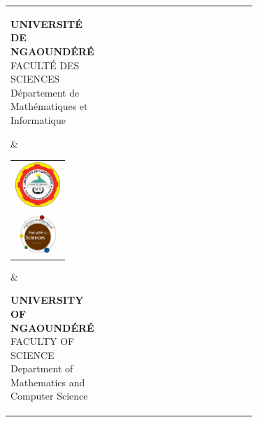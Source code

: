 \thispagestyle{empty}


\vspace*{-3.5cm}
\begin{center}
	\setlength{\tabcolsep}{2pt}
	\begin{tabular}[t]{p{0.35\linewidth} c p{0.35\linewidth}}
		\parbox[t]{\linewidth}{
			\raggedright
			{\bfseries UNIVERSITÉ DE NGAOUNDÉRÉ} \newline
			FACULTÉ DES SCIENCES \newline
			Département de Mathématiques \newline
			et Informatique
		}
		 &
		\begin{tabular}{c}
			\includegraphics[height=1.7cm]{figures/univ_logo.jpeg} \\[0.2cm]
			\includegraphics[height=1.5cm]{figures/fac_logo.jpeg}
		\end{tabular}
		 &
		\parbox[t]{\linewidth}{
			\raggedleft
			{\bfseries UNIVERSITY OF NGAOUNDÉRÉ} \newline
			FACULTY OF SCIENCE \newline
			Department of Mathematics \newline
			and Computer Science
		}
	\end{tabular}
\end{center}

\vspace{0.8cm}

